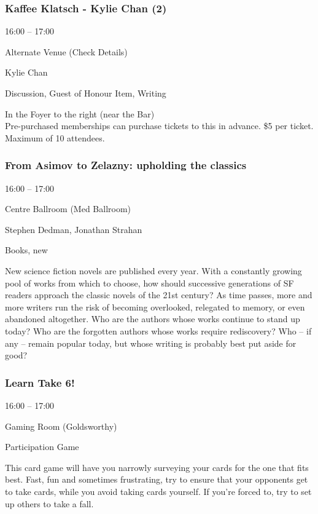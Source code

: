 \documentclass{scrreprt}
\begin{document}
\begin{multicols}{2}
\subsubsection*{Kaffee Klatsch - Kylie Chan (2)}\begin{description}
\setlength{\itemsep}{0pt}
\setlength{\parsep}{0pt}
\setlength{\parskip}{0pt}
\item[Time:]{16:00 -- 17:00}
\item[Venue:]{Alternate Venue (Check Details)}
\item[People:]{Kylie Chan}
\item[Tags:]{Discussion, Guest of Honour Item, Writing}\end{description}
In the Foyer to the right (near the Bar) \\Pre-purchased memberships can purchase tickets to this in advance. \$5 per ticket. Maximum of 10 attendees.
\subsubsection*{From Asimov to Zelazny: upholding the classics}\begin{description}
\setlength{\itemsep}{0pt}
\setlength{\parsep}{0pt}
\setlength{\parskip}{0pt}
\item[Time:]{16:00 -- 17:00}
\item[Venue:]{Centre Ballroom (Med Ballroom)}
\item[People:]{Stephen Dedman, Jonathan Strahan}
\item[Tags:]{Books, new}\end{description}
New science fiction novels are published every year. With a constantly growing pool of works from which to choose, how should successive generations of SF readers approach the classic novels of the 21st century? As time passes, more and more writers run the risk of becoming overlooked, relegated to memory, or even abandoned altogether. Who are the authors whose works continue to stand up today? Who are the forgotten authors whose works require rediscovery? Who – if any – remain popular today, but whose writing is probably best put aside for good?
\subsubsection*{Learn Take 6!}\begin{description}
\setlength{\itemsep}{0pt}
\setlength{\parsep}{0pt}
\setlength{\parskip}{0pt}
\item[Time:]{16:00 -- 17:00}
\item[Venue:]{Gaming Room (Goldsworthy)}
\item[Tags:]{Participation Game}\end{description}
This card game will have you narrowly surveying your cards for the one that fits best. Fast, fun and sometimes frustrating, try to ensure that your opponents get to take cards, while you avoid taking cards yourself. If you're forced to, try to set up others to take a fall.

\end{multicols}
\end{document}

